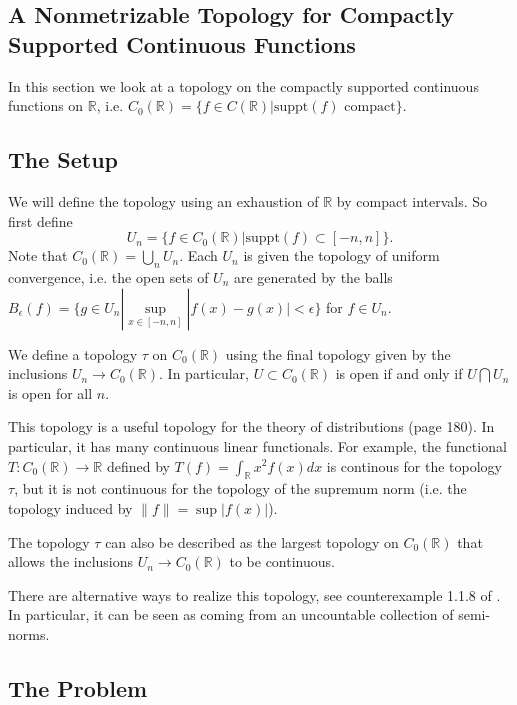 \subsection{A Nonmetrizable Topology for Compactly Supported Continuous Functions}

In this section we look at a topology on the compactly supported continuous functions on \(\mathbb R\), 
i.e. \(C_0(\mathbb R) = \{f \in C(\mathbb R) | \text{suppt}(f) \text{ compact}\}\). 

\subsection*{The Setup}

We will define the topology using an exhaustion of \(\mathbb R\) by compact intervals. So first
define 
\begin{equation}
U_n = \{f \in C_0(\mathbb R) | \text{suppt}(f) \subset [-n, n]\}.
\end{equation}
Note that \(C_0(\mathbb R) = \bigcup_n U_n\). Each \(U_n\) is given the topology of uniform convergence, 
i.e. the open sets of \(U_n\) are generated by the balls 
\(B_\epsilon(f) = \{g \in  U_n | \sup\limits_{x\in [-n, n]} |f(x) - g(x)| < \epsilon\}\) for \(f \in U_n\).

We define a topology \(\tau\) on \(C_0(\mathbb R)\) using the final topology given by the inclusions
\(U_n \to C_0(\mathbb R)\). In particular, \(U \subset C_0(\mathbb R)\) is open if and 
only if \(U \bigcap U_n\) is open for all \(n\).

This topology is a useful topology for the theory of distributions \cite{KrantzParks}(page 180).
In particular, it has many continuous linear functionals. For example, the functional 
\(T : C_0(\mathbb R) \to \mathbb R\) defined by \(T(f) = \int_{\mathbb R} x^2 f(x) dx\) is continous for
the topology \(\tau\), but it is not continuous for the topology of the supremum norm (i.e. the topology
induced by \(\|f\| = \sup |f(x)|\)). 

The topology \(\tau\) can also be described as the largest topology on \(C_0(\mathbb R)\) that
allows the inclusions \(U_n \to C_0(\mathbb R)\) to be continuous.

There are alternative ways to realize this topology, see counterexample 1.1.8 of
\cite{HamiltonInverseFunction}. In particular, it can be seen as coming from an uncountable collection
of semi-norms.

\subsection*{The Problem}

